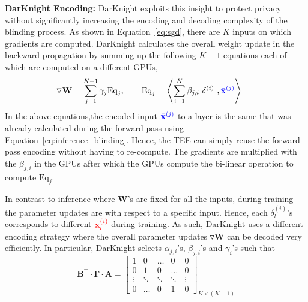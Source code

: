 \textbf{DarKnight Encoding:} DarKnight exploits this insight to protect privacy without significantly increasing the encoding and decoding complexity of the blinding process. 
As shown in Equation~\eqref{eq:sgd}, there are $K$ inputs on which gradients are computed. DarKnight calculates the overall weight update in the backward propagation by summing up the following $K+1$ equations each of which are computed on a different GPUs,
\begin{equation}\label{eq:gamma_lin}
\triangledown \mathbf{W} = \sum_{j=1}^{K+1}  \gamma_{j} \text{Eq}_{j}, \qquad \text{Eq}_{j} = \left\langle \sum_{i=1}^K \beta_{j,i}~ \mathbf \delta^{(i)}~,{\color{blue}\bar{\mathbf x}^{(j)}} \right\rangle~\quad~
\end{equation}
In the above equations,the encoded input ${\color{blue}\bar{\mathbf x}^{(j)}}$ to a layer is the same that was already calculated during the forward pass using Equation~\eqref{eq:inference_blinding}. Hence, the TEE can simply reuse the forward pass encoding without having to re-compute. The gradients are multiplied with the $\beta_{j,i}$ in the GPUs after which the GPUs compute the bi-linear operation to compute $\text{Eq}_{j}$. 

In contrast to inference where $\mathbf{W}$'s are fixed for all the inputs, during training the parameter updates are with respect to a specific input. Hence, each $\delta^{(i)}_l$'s corresponds to different ${\color{red}\mathbf{x}^{(i)}_l}$ during training. As such, DarKnight uses a different encoding strategy where the overall parameter updates $\triangledown \mathbf{W}$ can be decoded very efficiently. In particular, DarKnight selects $\alpha_{j,i}$'s, $\beta_{j,i}$'s and $\gamma_i$'s such that
\begin{equation}
    \mathbf B^\intercal\cdot \mathbf \Gamma\cdot \mathbf A = \begin{bmatrix}1 & 0 & \dots & 0 & 0
  \\0 & 1 & 0 & \dots & 0
  \\\vdots & \ddots& \ddots & \ddots & \vdots
\\ 0 & \dots & 0 & 1 & 0\end{bmatrix}_{K \times (K+1)}
\label{eq:matrix_relation1}
\end{equation}

